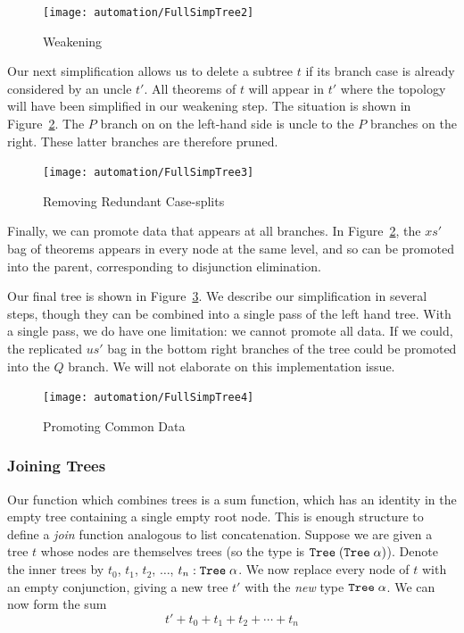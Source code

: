 \begin{figure}
\centering\texttt{[image: automation/FullSimpTree2]}
\caption{Weakening}
\label{fig:TreeWeakening}
\end{figure}

Our next simplification allows us to delete a subtree $t$ if its branch case is already considered by an uncle $t'$. All theorems of $t$ will appear in $t'$ where the topology will have been simplified in our weakening step. The situation is shown in Figure~\ref{fig:TreeRedundantSplits}. The $P$ branch on on the left-hand side is uncle to the $P$ branches on the right. These latter branches are therefore pruned.

\begin{figure}
\centering\texttt{[image: automation/FullSimpTree3]}
\caption{Removing Redundant Case-splits}
\label{fig:TreeRedundantSplits}
\end{figure}

Finally, we can promote data that appears at all branches. In Figure~\ref{fig:TreeRedundantSplits}, the $xs'$ bag of theorems appears in every node at the same level, and so can be promoted into the parent, corresponding to disjunction elimination. 

Our final tree is shown in Figure~\ref{fig:TreePromoting}. We describe our simplification in several steps, though they can be combined into a single pass of the left hand tree. With a single pass, we do have one limitation: we cannot promote all data. If we could, the replicated $us'$ bag in the bottom right branches of the tree could be promoted into the $Q$ branch. We will not elaborate on this implementation issue.

\begin{figure}
\centering\texttt{[image: automation/FullSimpTree4]}
\caption{Promoting Common Data}
\label{fig:TreePromoting}
\end{figure}

\subsubsection{Joining Trees}
Our function which combines trees is a sum function, which has an identity in the empty tree containing a single empty root node. This is enough structure to define a \emph{join} function analogous to list concatenation. Suppose we are given a tree $t$ whose nodes are themselves trees (so the type is $\texttt{Tree}\;(\texttt{Tree}\; \alpha)$). Denote the inner trees by $t_0$, $t_1$, $t_2$, $\ldots$, $t_n : \texttt{Tree}\;\alpha$. We now replace every node of $t$ with an empty conjunction, giving a new tree $t'$ with the \emph{new} type $\texttt{Tree}\;\alpha$. We can now form the sum 
\begin{displaymath}
t' + t_0 + t_1 + t_2 + \cdots + t_n
\end{displaymath}

